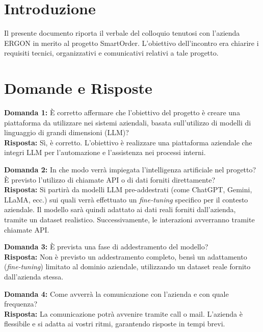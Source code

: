 \documentclass[a4paper,12pt]{article}
\begin{document}
\section{Introduzione}
Il presente documento riporta il verbale del colloquio tenutosi con l'azienda ERGON in merito al progetto SmartOrder.
L’obiettivo dell’incontro era chiarire i requisiti tecnici, organizzativi e comunicativi relativi a tale progetto.

\section{Domande e Risposte}

\textbf{Domanda 1:} È corretto affermare che l’obiettivo del progetto è creare una piattaforma da utilizzare nei sistemi aziendali, basata sull’utilizzo di modelli di linguaggio di grandi dimensioni (LLM)?\\[0.5em]
\textbf{Risposta:} Sì, è corretto. L’obiettivo è realizzare una piattaforma aziendale che integri LLM per l’automazione e l’assistenza nei processi interni.

\vspace{2em}

\textbf{Domanda 2:} In che modo verrà impiegata l’intelligenza artificiale nel progetto? È previsto l’utilizzo di chiamate API o di dati forniti direttamente?\\[0.5em]
\textbf{Risposta:} Si partirà da modelli LLM pre-addestrati (come ChatGPT, Gemini, LLaMA, ecc.) sui quali verrà effettuato un \textit{fine-tuning} specifico per il contesto aziendale. Il modello sarà quindi adattato ai dati reali forniti dall’azienda, tramite un dataset realistico. Successivamente, le interazioni avverranno tramite chiamate API.

\vspace{2em}

\textbf{Domanda 3:} È prevista una fase di addestramento del modello?\\[0.5em]
\textbf{Risposta:} Non è previsto un addestramento completo, bensì un adattamento (\textit{fine-tuning}) limitato al dominio aziendale, utilizzando un dataset reale fornito dall’azienda stessa.

\vspace{2em}

\textbf{Domanda 4:} Come avverrà la comunicazione con l’azienda e con quale frequenza?\\[0.5em]
\textbf{Risposta:} La comunicazione potrà avvenire tramite call o mail. L’azienda è flessibile e si adatta ai vostri ritmi, garantendo risposte in tempi brevi.
\end{document}
